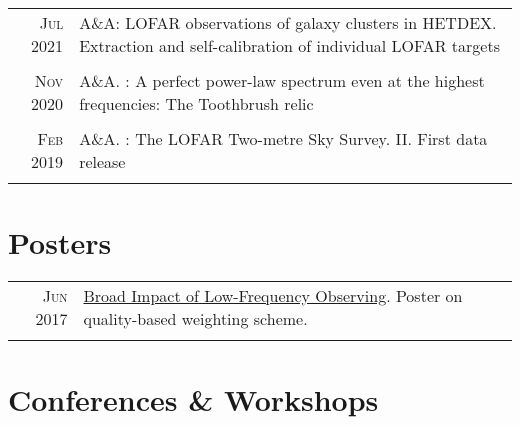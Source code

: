 \documentclass[11pt,a4paper,notitlepage]{article}
\begin{document}
\begin{tabular}{r|p{12.5cm}}

	
	\textsc{Jul 2021} & A\&A: LOFAR observations of galaxy clusters in HETDEX. Extraction and self-calibration of individual LOFAR targets \citep{2021AA...651A.115V} \\
	\multicolumn{2}{c}{} \\
	
	\textsc{Nov 2020} & A\&A. : A perfect power-law spectrum even at the highest frequencies: The Toothbrush relic\citep{2020AA...642L..13R} \\
	\multicolumn{2}{c}{} \\
%	
	
	\textsc{Feb 2019} & A\&A. : The LOFAR Two-metre Sky Survey. II. First data release \citep{2019AA...622A...1S} \\
	\multicolumn{2}{c}{} \\
	
\end{tabular}


\section{Posters}

\begin{tabular}{r|p{12.5cm}}
	\textsc{Jun 2017} & \href{https://www.radionet-org.eu/radionet/the-broad-impact-of-low-frequency-observing/}{Broad Impact of Low-Frequency Observing}. Poster on quality-based weighting scheme.\\
	\multicolumn{2}{c}{} \\
\end{tabular}

\section{Conferences \& Workshops}
\end{document}
